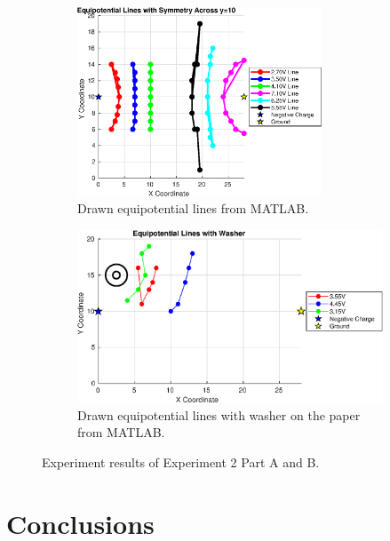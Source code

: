 \documentclass[11pt]{article}
\begin{document}
\begin{figure}[H]
    \begin{subfigure}{0.5\textwidth}
\centering
\includegraphics[width=0.8\textwidth]{./images/EquipotentialLines.eps}
\caption{Drawn equipotential lines from MATLAB.}
\label{sfig:eq}
    \end{subfigure}
    \begin{subfigure}{0.5\textwidth}
\centering
\includegraphics[width=1\textwidth]{./images/EquipotentialLinesWithWasher.eps}
\caption{Drawn equipotential lines with washer on the paper from MATLAB.}
\label{sfig:eqwasher}
    \end{subfigure}
    \caption{Experiment results of Experiment 2 Part A and B.}
    \label{fig:exp2data}
\end{figure}


\vspace{-1cm}
\section{Conclusions}
\end{document}
